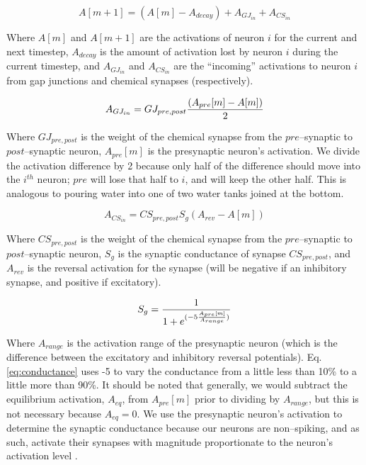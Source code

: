 \documentclass[letterpaper]{article}
\begin{document}
\begin{equation}
    A[m+1] = (A[m] - A_{decay}) + A_{GJ_{in}} + A_{CS_{in}} 
\end{equation}

Where $A[m]$ and $A[m+1]$ are the activations of neuron $i$ for the current and next timestep, $A_{decay}$ is the amount of activation lost by neuron $i$ during the current timestep, and $A_{GJ_{in}}$ and $A_{CS_{in}}$ are the ``incoming'' activations to neuron $i$ from gap junctions and chemical synapses (respectively).

\begin{equation}
    A_{GJ_{in}} =  GJ_{pre,post} {(A_{pre}[m] - A[m]) \over 2}
\end{equation}

Where $GJ_{pre,post}$ is the weight of the chemical synapse from the $pre$--synaptic to $post$--synaptic neuron, $A_{pre}[m]$ is the presynaptic neuron's activation. We divide the activation difference by 2 because only half of the difference should move into the $i^{th}$ neuron; $pre$ will lose that half to $i$, and will keep the other half. This is analogous to pouring water into one of two water tanks joined at the bottom.

\begin{equation}
    A_{CS_{in}} =  CS_{pre,post} S_g  (A_{rev} - A[m])
\end{equation}

Where $CS_{pre,post}$ is the weight of the chemical synapse from the $pre$--synaptic to $post$--synaptic neuron, $S_g$ is the synaptic conductance of synapse $CS_{pre,post}$, and $A_{rev}$ is the reversal activation for the synapse (will be negative if an inhibitory synapse, and positive if excitatory).

\begin{equation}
    \label{eq:conductance}
    S_g = {1 \over { 1 + e^{(-5 { A_{pre}[m] \over A_{range} } )} }}
\end{equation}

Where $A_{range}$ is the activation range of the presynaptic neuron (which is the difference between the excitatory and inhibitory reversal potentials). Eq. \ref{eq:conductance} uses -5 to vary the conductance from a little less than 10\% to a little more than 90\%.
It should be noted that generally, we would subtract the equilibrium activation, $A_{eq}$, from $A_{pre}[m]$ prior to dividing by $A_{range}$, but this is not necessary because $A_{eq} = 0$.
We use the presynaptic neuron's activation to determine the synaptic conductance because our neurons are non--spiking, and as such, activate their synapses with magnitude  proportionate to the neuron's activation level \citep{Wicks1996}.
\end{document}
